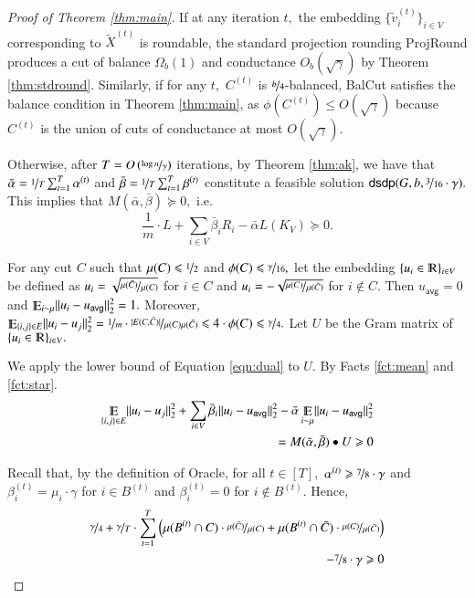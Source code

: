 \documentclass[twoside,leqno,twocolumn]{article}
\newcommand{\nfrac}{\nicefrac}
\renewcommand{\mathbb}{\varmathbb}
\renewcommand{\leq}{\leqslant}
\renewcommand{\geq}{\geqslant}
\newcommand{\abs}[1]{\lvert#1\rvert}
\newcommand{\norm}[1]{\lVert#1\rVert}
\newcommand{\R}{\mathbb R}
\newcommand{\card}{\abs}
\newcommand{\Esymb}{\mathbb{E}}
\DeclareMathOperator*{\E}{\Esymb}
\numberwithin{equation}{section}
\newcommand{\dsdp}{{\ensuremath{\mathsf{dsdp}}\xspace}}
\newcommand{\alg}{{\sc BalCut}\xspace}
\newcommand{\avg}{{\ensuremath{\mathsf{avg}}\xspace}}
\begin{document}
\begin{proof}[Proof of Theorem \ref{thm:main}]
If at any iteration $t,$ the embedding $\{\tilde{v}_i^{(t)}\}_{i \in V}$ corresponding to $\tilde{X}^{(t)}$  is roundable, the standard projection rounding {\sc ProjRound}\xspace produces a cut of balance $\Omega_b(1)$ and conductance $O_b(\sqrt{\gamma})$ by Theorem \ref{thm:stdround}. Similarly, if for any $t,$ $C^{(t)}$ is $\nfrac{b}{4}$-balanced, \alg satisfies the balance condition  in Theorem \ref{thm:main}, as $\phi(C^{(t)}) \leq O(\sqrt{\gamma})$ because $C^{(t)}$ is the union of cuts of conductance at most $O(\sqrt{\gamma}).$


Otherwise, after $T=O\left(\nfrac{\log n}{\gamma}\right)$ iterations, by Theorem \ref{thm:ak}, we have that  $\bar{\alpha} =\nfrac{1}{T} \sum_{t=1}^T  \alpha^{(t)}$ and $\bar{\beta} = \nfrac{1}{T} \sum_{t=1}^T \beta^{(t)}$ constitute a feasible solution  $\dsdp(G,b, \nfrac{3}{16} \cdot\gamma).$ This implies that
$ 
M(\bar{\alpha}, \bar{\beta}) \succeq 0,$ i.e.
\begin{equation}\label{eqn:dual}
\frac{1}{m} \cdot L +  \sum_{i \in V} \bar{\beta}_i R_i -  \bar{\alpha} L(K_V) \succeq 0 .
\end{equation}

For any cut $C$ such that $\mu(C) \leq \nfrac{1}{2}$ and $\phi(C) \leq \nfrac{\gamma}{16},$ let the embedding $\{ u_i \in \R \}_{i \in V}$ be defined as $u_i = \sqrt{\nfrac{\mu(\bar{C})}{\mu(C)}}$ for $i \in C$ and $u_i = -\sqrt{\nfrac{\mu(C)}{\mu(\bar{C})}}$ for $i \notin C.$
Then $u_\avg = 0$ and $\E_{i \sim \mu} \norm{u_i - u_\avg}_2^2 = 1.$ Moreover, $\E_{\{i,j\} \in E} \norm{u_i - u_j}_2^2 = \nfrac{1}{m} \cdot \nfrac{\card{E(C, \bar{C})}}{\mu(C)\mu(\bar{C})} \leq 4 \cdot \phi(C) \leq \nfrac{\gamma}{4}.$  
Let $U$ be the Gram matrix of  $\{ u_i \in \R \}_{i \in V}.$

We apply the lower bound of Equation \ref{eqn:dual} to $U.$ By Facts \ref{fct:mean} and \ref{fct:star}.
\begin{align*}
\E_{\{i,j\} \in E} \norm{u_i - u_j}_2^2 + \sum_{i \in V} \bar{\beta}_i \norm{u_i - u_\avg}^2_2 - \bar{\alpha} \E_{i \sim \mu}\norm{u_i - u_\avg}_2^2 \\
= M(\bar{\alpha}, \bar{\beta}) \bullet U \geq 0
\end{align*}

Recall that, by the definition of {\sc Oracle}, for all $t \in [T],$ $ \alpha^{(t)} \geq \nfrac{7}{8} \cdot \gamma$ and $\beta^{(t)}_i = \mu_i \cdot \gamma$ for $i \in B^{(t)}$ and $\beta^{(t)}_i = 0$ for $i \notin B^{(t)}.$ Hence,
\begin{eqnarray*}
\nfrac{\gamma}{4} + \nfrac{\gamma}{T} \cdot \sum_{t=1}^T  \left( \mu(B^{(t)} \cap C) \cdot \nfrac{\mu(\bar{C})}{\mu(C)} + \mu(B^{(t)} \cap \bar{C}) \cdot \nfrac{\mu(C)}{\mu(\bar{C})} \right) \\ - \nfrac{7}{8} \cdot \gamma \geq 0 
\end{eqnarray*}


\end{proof}
\end{document}
